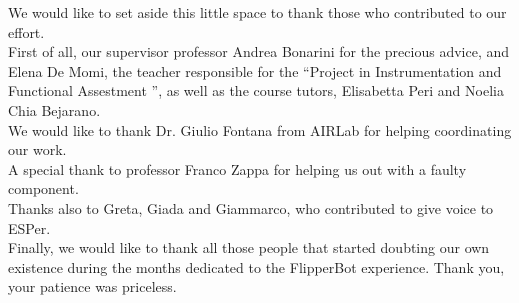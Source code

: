 \documentclass[a4paper,twoside]{book}
\begin{document}
We would like to set aside this little space to thank those who contributed to our effort.
\\
First of all, our supervisor professor Andrea Bonarini for the precious advice, and Elena De Momi, the teacher responsible for the \textquotedblleft Project in Instrumentation and Functional Assestment \textquotedblright, as well as the course tutors, Elisabetta Peri and Noelia Chia Bejarano.
\\
We would like to thank Dr. Giulio Fontana from AIRLab for helping coordinating our work.
\\
A special thank to professor Franco Zappa for helping us out with a faulty component.
\\
Thanks also to Greta, Giada and Giammarco, who contributed to give voice to ESPer.
\\
Finally, we would like to thank all those people that started doubting our own existence during the months dedicated to the FlipperBot experience. Thank you, your patience was priceless.
\end{document}
